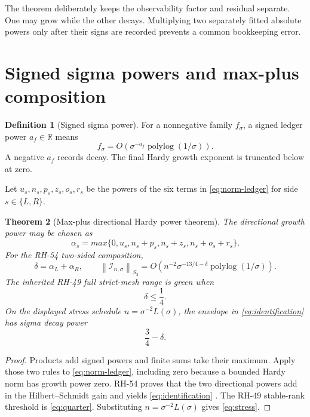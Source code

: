 \documentclass[11pt]{article}
\newtheorem{theorem}{Theorem}[section]
\theoremstyle{definition}
\newtheorem{definition}[theorem]{Definition}
\theoremstyle{remark}
\newcommand{\norm}[1]{\left\lVert#1\right\rVert}
\begin{document}
The theorem deliberately keeps the observability factor and residual
separate.  One may grow while the other decays.  Multiplying two separately
fitted absolute powers only after their signs are recorded prevents a common
bookkeeping error.

\section{Signed sigma powers and max-plus composition}
\label{sec:powers}

\begin{definition}[Signed sigma power]
For a nonnegative family $f_\sigma$, a signed ledger power $a_f\in\mathbb R$
means
\[
 f_\sigma
 =O\!\left(\sigma^{-a_f}
 \operatorname{polylog}(1/\sigma)\right).
\]
A negative $a_f$ records decay.  The final Hardy growth exponent is truncated
below at zero.
\end{definition}

Let $u_s,n_s,p_s,z_s,o_s,r_s$ be the powers of the six terms in
\eqref{eq:norm-ledger} for side $s\in\{L,R\}$.

\begin{theorem}[Max-plus directional Hardy power theorem]
\label{thm:power-ledger}
The directional growth power may be chosen as
\begin{equation}
 \boxed{
 \alpha_s=max\{0,u_s,n_s+p_s,n_s+z_s,n_s+o_s+r_s\}.}
 \label{eq:alpha}
\end{equation}
For the RH-54 two-sided composition,
\begin{equation}
 \delta=\alpha_L+\alpha_R,
 \qquad
 \norm{\mathcal I_{n,\sigma}}_{S_2}
 =O\!\left(n^{-2}\sigma^{-13/4-\delta}
 \operatorname{polylog}(1/\sigma)\right).
 \label{eq:identification}
\end{equation}
The inherited RH-49 full strict-mesh range is green when
\begin{equation}
 \delta\le\frac14.
 \label{eq:quarter}
\end{equation}
On the displayed stress schedule
$n=\sigma^{-2}L(\sigma)$, the envelope in
\eqref{eq:identification} has sigma decay power
\begin{equation}
 \frac34-\delta.
 \label{eq:stress}
\end{equation}
\end{theorem}

\begin{proof}
Products add signed powers and finite sums take their maximum.  Apply those
two rules to \eqref{eq:norm-ledger}, including zero because a bounded Hardy
norm has growth power zero.  RH-54 proves that the two directional powers add
in the Hilbert--Schmidt gain and yields \eqref{eq:identification}
\citep{WangFactorAware2026}.  The RH-49 stable-rank threshold is
\eqref{eq:quarter}.  Substituting $n=\sigma^{-2}L(\sigma)$ gives
\eqref{eq:stress}.
\end{proof}
\end{document}
